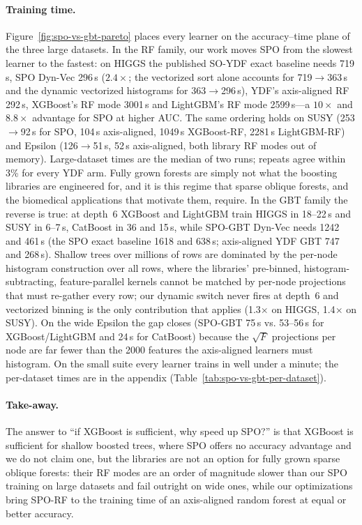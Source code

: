 \paragraph{Training time.}
Figure~\ref{fig:spo-vs-gbt-pareto} places every learner on the accuracy--time plane of the three
large datasets. In the RF family, our work moves SPO from the slowest learner to the fastest: on
HIGGS the published SO-YDF exact baseline needs 719\,s, SPO Dyn-Vec 296\,s ($2.4\times$; the
vectorized sort alone accounts for 719$\to$363\,s and the dynamic vectorized histograms for
363$\to$296\,s), YDF's axis-aligned RF 292\,s, XGBoost's RF mode 3001\,s and LightGBM's RF mode
2599\,s---a $10\times$ and $8.8\times$ advantage for SPO at higher AUC. The same ordering holds
on SUSY (253$\to$92\,s for SPO, 104\,s axis-aligned, 1049\,s XGBoost-RF, 2281\,s LightGBM-RF) and
Epsilon (126$\to$51\,s, 52\,s axis-aligned, both library RF modes out of memory). Large-dataset
times are the median of two runs; repeats agree within 3\% for every YDF arm. Fully grown
forests are simply not what the boosting libraries are engineered for, and it is this regime
that sparse oblique forests, and the biomedical applications that motivate them, require. In
the GBT family the reverse is true: at depth~6 XGBoost and LightGBM train HIGGS in
18--22\,s and SUSY in 6--7\,s, CatBoost in 36 and 15\,s, while SPO-GBT Dyn-Vec needs 1242 and
461\,s (the SPO exact baseline 1618 and 638\,s; axis-aligned YDF GBT 747 and 268\,s). Shallow
trees over millions of rows are dominated by the per-node histogram construction over all rows,
where the libraries' pre-binned, histogram-subtracting, feature-parallel kernels cannot be
matched by per-node projections that must re-gather every row; our dynamic switch never fires
at depth~6 and vectorized binning is the only contribution that applies (1.3$\times$ on HIGGS,
1.4$\times$ on SUSY). On the wide Epsilon the gap closes (SPO-GBT 75\,s vs. 53--56\,s for
XGBoost/LightGBM and 24\,s for CatBoost) because the $\sqrt{F}$ projections per node are far
fewer than the 2000 features the axis-aligned learners must histogram. On the small suite
every learner trains in well under a minute; the per-dataset times are in the appendix
(Table~\ref{tab:spo-vs-gbt-per-dataset}).

\paragraph{Take-away.}
The answer to ``if XGBoost is sufficient, why speed up SPO?'' is that XGBoost is sufficient for
shallow boosted trees, where SPO offers no accuracy advantage and we do not claim one, but the
libraries are not an option for fully grown sparse oblique forests: their RF modes are an order
of magnitude slower than our SPO training on large datasets and fail outright on wide ones,
while our optimizations bring SPO-RF to the training time of an axis-aligned random forest at
equal or better accuracy.

